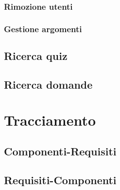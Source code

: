 \documentclass[a4paper, titlepage]{article}
\begin{document}


\subsubsection{Rimozione utenti}

\subsubsection{Gestione argomenti}

\subsection{Ricerca quiz}

\subsection{Ricerca domande}




\section{Tracciamento}

\subsection{Componenti-Requisiti}


\subsection{Requisiti-Componenti}

\end{document}

